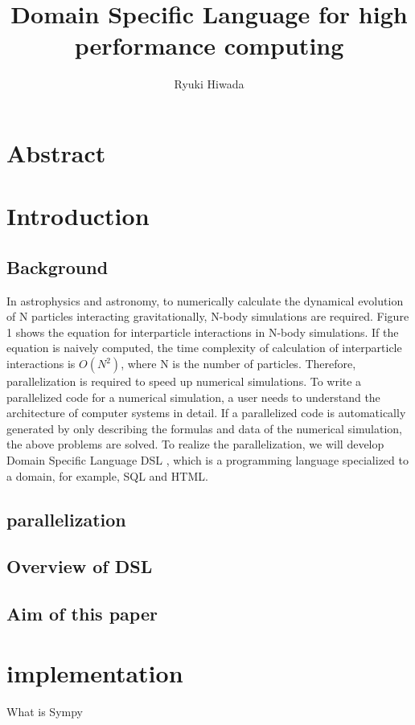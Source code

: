 \documentclass[ams]{U-AizuGT}
\author{Ryuki Hiwada}
\title{Domain Specific Language for high performance computing}
\begin{document}
\maketitle
\section{Abstract}
\section{Introduction}
\subsection{Background}
In astrophysics and astronomy, to numerically calculate the dynamical 
evolution of N particles interacting gravitationally, N-body simulations 
are required. Figure 1 shows the equation for interparticle interactions 
in N-body simulations. If the equation is naively computed, the time
complexity of calculation of interparticle interactions is 
\begin{math}O(N^2) \end{math}, where 
N is the number of particles. Therefore, parallelization is required to
speed up numerical simulations. To write a parallelized code for a 
numerical simulation, a user needs to understand the architecture of 
computer systems in  detail. If a parallelized code is automatically
generated by only describing the formulas and data of the numerical
simulation, the above problems are solved. To realize the parallelization,
we will develop Domain Specific Language \lparen DSL \rparen, which is a 
programming language specialized to a domain, for example, SQL and HTML.
\subsection{parallelization}
\subsection{Overview of DSL}
\subsection{Aim of this paper}

\section{implementation}
What is Sympy
\end{document}
